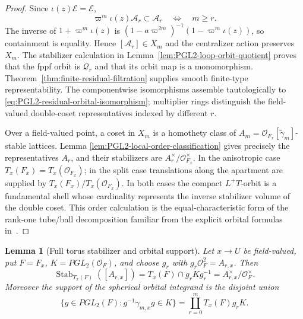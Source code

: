 \documentclass[11pt]{article}
\newtheorem{lemma}[theorem]{Lemma}
\theoremstyle{definition}
\theoremstyle{remark}
\begin{document}
\begin{proof}
Since $\iota(z)\mathcal E=\mathcal E$,
\[
 \varpi^m\iota(z)\mathcal A_r\subset\mathcal A_r
 \quad\Longleftrightarrow\quad m\ge r.
\]
The inverse of $1+\varpi^m\iota(z)$ is
$(1-a\varpi^{2m})^{-1}(1-\varpi^m\iota(z))$, so containment is equality.
Hence $[\mathcal A_r]\in X_m$ and the centralizer action preserves $X_m$.
The stabilizer calculation in Lemma~\ref{lem:PGL2-loop-orbit-quotient} proves
that the fppf orbit is $\mathscr Q_r$ and that its orbit map is a monomorphism.
Theorem~\ref{thm:finite-residual-filtration} supplies smooth finite-type
representability.  The componentwise isomorphisms assemble tautologically to
\eqref{eq:PGL2-residual-orbital-isomorphism}; multiplier rings distinguish the
field-valued double-coset representatives indexed by different $r$.

Over a field-valued point, a coset in $X_m$ is a homothety class of
$A_m=\mathcal O_{F_x}[\widetilde\gamma_m]$-stable lattices.  Lemma
\ref{lem:PGL2-local-order-classification} gives precisely the representatives
$A_r$, and their stabilizers are
$A_r^\times/\mathcal O_{F_x}^\times$.  In the anisotropic case
$T_x(F_x)=T_x(\mathcal O_{F_x})$; in the split case translations along the
apartment are supplied by $T_x(F_x)/T_x(\mathcal O_{F_x})$.  In both cases
the compact $L^+T$-orbit is a fundamental shell whose cardinality represents
the inverse stabilizer volume of the double coset.  This order calculation is
the equal-characteristic form of the rank-one tube/ball decomposition familiar
from the explicit orbital formulas in~\cite[Sections~5.8--5.9]{KottwitzOrbital}.
\end{proof}

\begin{lemma}[Full torus stabilizer and orbital support]
\label{lem:PGL2-full-stabilizer-support}
Let $x\to U$ be field-valued, put $F=F_x$, $K=PGL_2(\mathcal O_F)$, and
choose $g_r$ with $g_r\mathcal O_F^2=A_{r,x}$.  Then
\begin{equation}
 \operatorname{Stab}_{T_x(F)}([A_{r,x}])
 =T_x(F)\cap g_rKg_r^{-1}
 =A_{r,x}^\times/\mathcal O_F^\times.
 \label{eq:PGL2-full-torus-stabilizer}
\end{equation}
Moreover the support of the spherical orbital integrand is the disjoint union
\begin{equation}
 \{g\in PGL_2(F):g^{-1}\gamma_{m,x}g\in K\}
 =\coprod_{r=0}^m T_x(F)g_rK.
 \label{eq:PGL2-orbital-support-decomposition}
\end{equation}
\end{lemma}
\end{document}
